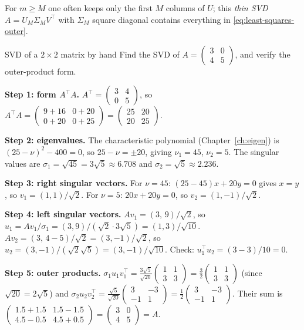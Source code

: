 For $m\ge M$ one often keeps only the first $M$ columns of $U$; this \emph{thin SVD} $A = U_M\Sigma_M V^\top$ with $\Sigma_M$ square diagonal contains everything in \cref{eq:least-squares-outer}.

\begin{sample}{SVD of a $2\times2$ matrix by hand}
Find the SVD of $A = \begin{pmatrix}3&0\\4&5\end{pmatrix}$, and verify the outer-product form.

\textbf{Step 1: form $A^\top A$.} $A^\top = \begin{pmatrix}3&4\\0&5\end{pmatrix}$, so $A^\top A = \begin{pmatrix}9+16 & 0+20\\ 0+20 & 0+25\end{pmatrix} = \begin{pmatrix}25&20\\20&25\end{pmatrix}$.

\textbf{Step 2: eigenvalues.} The characteristic polynomial (Chapter~\ref{ch:eigen}) is $(25-\nu)^2 - 400 = 0$, so $25-\nu = \pm20$, giving $\nu_1 = 45$, $\nu_2 = 5$. The singular values are $\sigma_1 = \sqrt{45} = 3\sqrt5 \approx 6.708$ and $\sigma_2 = \sqrt5 \approx 2.236$.

\textbf{Step 3: right singular vectors.} For $\nu=45$: $(25-45)x + 20 y = 0$ gives $x=y$, so $v_1 = (1,1)/\sqrt2$. For $\nu = 5$: $20x + 20y = 0$, so $v_2 = (1,-1)/\sqrt2$.

\textbf{Step 4: left singular vectors.} $Av_1 = (3,\,9)/\sqrt2$, so $u_1 = Av_1/\sigma_1 = (3,9)/(\sqrt2\cdot3\sqrt5) = (1,3)/\sqrt{10}$. $Av_2 = (3,\,4-5)/\sqrt2 = (3,-1)/\sqrt2$, so $u_2 = (3,-1)/(\sqrt2\sqrt5) = (3,-1)/\sqrt{10}$. Check: $u_1^\top u_2 = (3-3)/10 = 0$.

\textbf{Step 5: outer products.} $\sigma_1 u_1v_1^\top = \frac{3\sqrt5}{\sqrt{20}}\begin{pmatrix}1&1\\3&3\end{pmatrix} = \frac32\begin{pmatrix}1&1\\3&3\end{pmatrix}$ (since $\sqrt{20}=2\sqrt5$) and $\sigma_2u_2v_2^\top = \frac{\sqrt5}{\sqrt{20}}\begin{pmatrix}3&-3\\-1&1\end{pmatrix} = \frac12\begin{pmatrix}3&-3\\-1&1\end{pmatrix}$. Their sum is $\begin{pmatrix}1.5+1.5 & 1.5-1.5\\ 4.5-0.5 & 4.5+0.5\end{pmatrix} = \begin{pmatrix}3&0\\4&5\end{pmatrix} = A$.


\end{sample}
